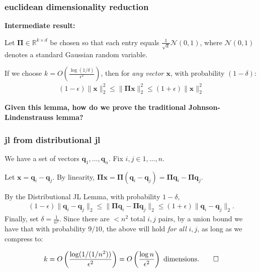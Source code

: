 \documentclass[compress]{beamer}
\newcommand{\bs}[1]{\boldsymbol{#1}}
\newcommand{\bv}[1]{\mathbf{#1}}
\newcommand{\R}{\mathbb{R}}
\begin{document}
\begin{frame}
	\frametitle{euclidean dimensionality reduction}
	\textbf{Intermediate result:}
	\begin{lemma}
		Let $\bs{\Pi} \in \R^{k\times d}$ be chosen so that each entry equals $\frac{1}{\sqrt{k}}  \mathcal{N}(0,1)$, where $\mathcal{N}(0,1)$ denotes a standard Gaussian random variable. 
		
		If we choose $k = O\left(\frac{\log(1/\delta)}{\epsilon^2}\right)$, then for \emph{any vector $\bv{x}$}, with probability $(1-\delta)$:
		\begin{align*}
			(1-\epsilon)\|\bv{x}\|_2^2 \leq \|\bs{\Pi}\bv{x}\|_2^2 \leq (1+\epsilon) \|\bv{x}\|_2^2
		\end{align*}
	\end{lemma}
	
	\begin{center}\alert{
			\textbf{Given this lemma, how do we prove the traditional Johnson-Lindenstrauss lemma?}}
	\end{center}
\end{frame}

\begin{frame}
	\frametitle{jl from distributional jl}
	We have a set of vectors $\bv{q}_1, \ldots, \bv{q}_n$. Fix $i,j \in 1,\ldots, n$. 
	
	Let $\bv{x} = \bv{q}_i - \bv{q}_j$. By linearity, $\bs{\Pi}\bv{x} = \bs{\Pi}(\bv{q}_i - \bv{q}_j) = \bs{\Pi}\bv{q}_i - \bs{\Pi}\bv{q}_j$.
	
	By the Distributional JL Lemma, with probability $1-\delta$,
	\begin{align*}
		(1-\epsilon)\|\bv{q}_i - \bv{q}_j\|_2 \leq \|\bs{\Pi}\bv{q}_i - \bs{\Pi}\bv{q}_j\|_2 \leq (1+\epsilon) \|\bv{q}_i - \bv{q}_j\|_2.
	\end{align*}
	Finally, set $\delta = \frac{1}{n^2}$. Since there are $< n^2$ total $i,j$ pairs, by a union bound we have that with probability $9/10$, the above will hold \emph{for all} $i,j$, as long as we compress to:
	
	\begin{align*}
		k = O\left(\frac{\log(1/(1/n^2))}{\epsilon^2}\right) = O\left(\frac{\log n}{\epsilon^2}\right) \text{ dimensions.}\qed
	\end{align*}
	
\end{frame}
\end{document}
